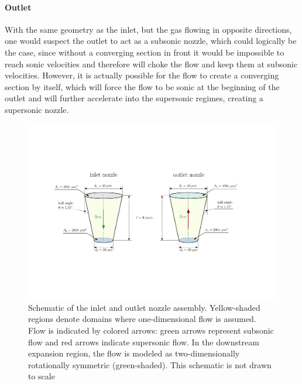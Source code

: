 	\paragraph{Outlet}
		With the same geometry as the inlet, but the gas flowing in opposite directions, one would suspect the outlet to act as a subsonic nozzle, which could logically be the case, since without a converging section in front it would be impossible to reach sonic velocities and therefore will choke the flow and keep them at subsonic velocities.
		However, it is actually possible for the flow to create a converging section by itself, which will force the flow to be sonic at the beginning of the outlet and will further accelerate into the supersonic regimes, creating a supersonic nozzle.
		\cite{jousten_handbook_2016}
	\begin{figure}[H]
	    \centering
	    \includegraphics[width=\textwidth]{src/03_analytical-work/fig_nozzle-geometries.pdf}
	    \caption{
			Schematic of the inlet and outlet nozzle assembly.
			Yellow-shaded regions denote domains where one-dimensional flow is assumed.
			Flow is indicated by colored arrows: green arrows represent subsonic flow and red arrows indicate supersonic flow.
			In the downstream expansion region, the flow is modeled as two-dimensionally rotationally symmetric (green-shaded).
			This schematic is not drawn to scale
		}
	    \label{fig:geometry-nozzles}
	\end{figure}

